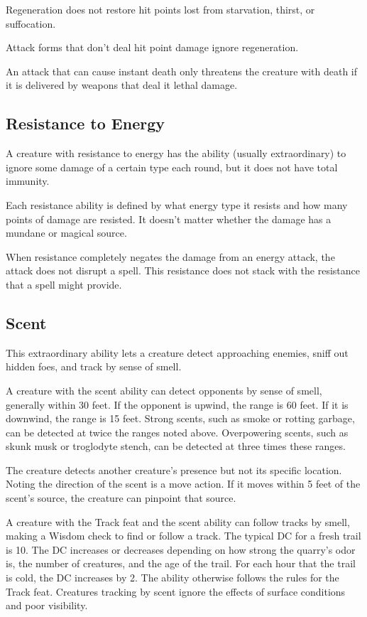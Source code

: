 Regeneration does not restore hit points lost from starvation, thirst, or suffocation.

Attack forms that don't deal hit point damage ignore regeneration.

An attack that can cause instant death only threatens the creature with death if 
it is delivered by weapons that deal it lethal damage.

\subsection{Resistance to Energy}

A creature with resistance to energy has the ability (usually extraordinary) to 
ignore some damage of a certain type each round, but it does not have total immunity. 

Each resistance ability is defined by what energy type it resists and how many 
points of damage are resisted. It doesn't matter whether the damage has a mundane 
or magical source.

When resistance completely negates the damage from an energy attack, the attack 
does not disrupt a spell. This resistance does not stack with the resistance that 
a spell might provide.

\subsection{Scent}

This extraordinary ability lets a creature detect approaching enemies, sniff out 
hidden foes, and track by sense of smell.

A creature with the scent ability can detect opponents by sense of smell, generally 
within 30 feet. If the opponent is upwind, the range is 60 feet. If it is downwind, 
the range is 15 feet. Strong scents, such as smoke or rotting garbage, can be detected 
at twice the ranges noted above. Overpowering scents, such as skunk musk or troglodyte 
stench, can be detected at three times these ranges.

The creature detects another creature's presence but not its specific location. 
Noting the direction of the scent is a move action. If it moves within 5 feet of 
the scent's source, the creature can pinpoint that source.

A creature with the Track feat and the scent ability can follow tracks by smell, 
making a Wisdom check to find or follow a track. The typical DC for a fresh trail 
is 10. The DC increases or decreases depending on how strong the quarry's odor 
is, the number of creatures, and the age of the trail. For each hour that the trail 
is cold, the DC increases by 2. The ability otherwise follows the rules for the 
Track feat. Creatures tracking by scent ignore the effects of surface conditions 
and poor visibility.

